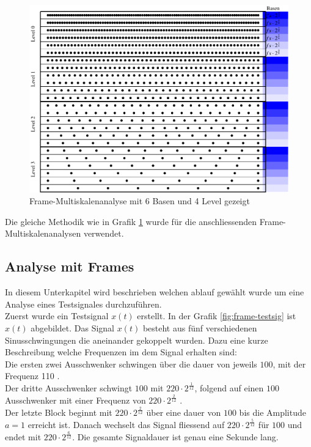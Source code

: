 \begin{figure}[h]
	\centering
	\includegraphics[width=\linewidth]{papers/autotune/sections/frames/images/msa/msa.pdf}
	\caption{Frame-Multiskalenanalyse mit 6 Basen und 4 Level gezeigt}\label{fig:frame_konst}
\end{figure}%

Die gleiche Methodik wie in Grafik \ref{fig:frame_konst} wurde für die anschliessenden Frame-Multiskalenanalysen verwendet.


\subsection{Analyse mit Frames}
In diesem Unterkapitel wird beschrieben welchen ablauf gewählt wurde um eine Analyse eines Testsignales durchzuführen.\\
Zuerst wurde ein Testsignal $x(t)$ erstellt. In der Grafik \ref{fig:frame-testsig} ist $x(t)$ abgebildet. Das Signal $x(t)$ besteht aus fünf verschiedenen Sinusschwingungen die aneinander gekoppelt wurden. Dazu eine kurze Beschreibung welche Frequenzen im dem Signal erhalten sind:\\
Die ersten zwei Ausschwenker schwingen über die dauer von jeweils $100$, mit der Frequenz 110 \text{[Hz]}. \\
Der dritte Ausschwenker schwingt $100$\text{[ms]} mit $220\cdot 2^{\frac{1}{12}}$\text{[Hz]}, folgend auf einen $100$\text{[ms]} Ausschwenker mit einer Frequenz von $220\cdot 2^{\frac{2}{12}}$ \text{[Hz]}. \\
Der letzte Block beginnt mit $220\cdot 2^{\frac{2}{12}}$\text{[Hz]} über eine dauer von $100$\text{[ms]} bis die Amplitude $a=1$ erreicht ist. Danach wechselt das Signal fliessend auf $220\cdot 2^{\frac{5}{12}}$\text{[Hz]} für $100$\text{[ms]} und endet mit $220\cdot 2^{\frac{6}{12}}$\text{[Hz]}. Die gesamte Signaldauer ist genau eine Sekunde lang. \\



